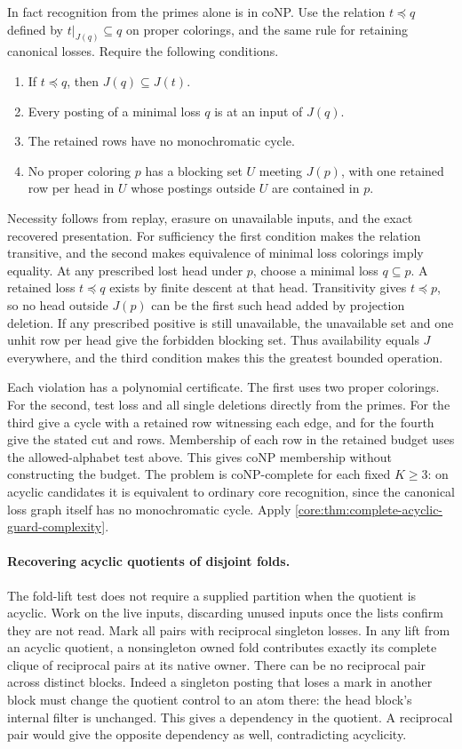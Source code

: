 In fact recognition from the primes alone is in coNP.
Use the relation $t\preceq q$ defined by
$t|_{J(q)}\subseteq q$ on proper colorings, and the
same rule for retaining canonical losses. Require the
following conditions.
\begin{enumerate}
\item If $t\preceq q$, then $J(q)\subseteq J(t)$.
\item Every posting of a minimal loss $q$ is at an
input of $J(q)$.
\item The retained rows have no monochromatic cycle.
\item No proper coloring $p$ has a blocking set $U$
meeting $J(p)$, with one retained row per head in
$U$ whose postings outside $U$ are contained in $p$.
\end{enumerate}
Necessity follows from replay, erasure on unavailable
inputs, and the exact recovered presentation. For
sufficiency the first condition makes the relation
transitive, and the second makes equivalence of
minimal loss colorings imply equality. At any
prescribed lost head under $p$, choose a minimal
loss $q\subseteq p$. A retained loss $t\preceq q$
exists by finite descent at that head. Transitivity
gives $t\preceq p$, so no head outside $J(p)$ can
be the first such head added by projection deletion.
If any prescribed positive is still unavailable,
the unavailable set and one unhit row per head
give the forbidden blocking set. Thus availability
equals $J$ everywhere, and the third condition
makes this the greatest bounded operation.

Each violation has a polynomial certificate. The
first uses two proper colorings. For the second,
test loss and all single deletions directly from
the primes. For the third give a cycle with a
retained row witnessing each edge, and for the
fourth give the stated cut and rows. Membership
of each row in the retained budget uses the
allowed-alphabet test above. This gives coNP
membership without constructing the budget.
The problem is coNP-complete for each fixed
$K\geq3$: on acyclic candidates it is equivalent
to ordinary core recognition, since the canonical
loss graph itself has no monochromatic cycle.
Apply \cref{core:thm:complete-acyclic-guard-complexity}.

\paragraph{Recovering acyclic quotients of disjoint folds.}
The fold-lift test does not require a supplied
partition when the quotient is acyclic. Work on
the live inputs, discarding unused inputs once
the lists confirm they are not read. Mark all
pairs with reciprocal singleton losses. In
any lift from an acyclic quotient, a nonsingleton
owned fold contributes exactly its complete
clique of reciprocal pairs at its native owner.
There can be no reciprocal pair across distinct
blocks. Indeed a singleton posting that loses
a mark in another block must change the quotient
control to an atom there: the head block's
internal filter is unchanged. This gives a
dependency in the quotient. A reciprocal pair
would give the opposite dependency as well,
contradicting acyclicity.

